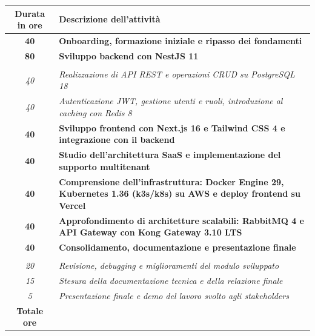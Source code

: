 

\begin{tabularx}{\textwidth}{|c|X|}
	\hline
	\textbf{Durata in ore} & \textbf{Descrizione dell'attività} \\\hline

	\textbf{40} & \textbf{Onboarding, formazione iniziale e ripasso dei fondamenti} \\
	\hline

	\textbf{80} & \textbf{Sviluppo backend con NestJS 11} \\ \hdashline
	\multirow{2}{0cm}\\
	\textit{40} &
	\textit{Realizzazione di API REST e operazioni CRUD su PostgreSQL 18} \\
	\textit{40} &
	\textit{Autenticazione JWT, gestione utenti e ruoli, introduzione al caching con Redis 8} \\
	\hline

	\textbf{40} & \textbf{Sviluppo frontend con Next.js 16 e Tailwind CSS 4 e integrazione con il backend} \\
	\hline

	\textbf{40} & \textbf{Studio dell'architettura SaaS e implementazione del supporto multitenant} \\
	\hline

	\textbf{40} & \textbf{Comprensione dell'infrastruttura: Docker Engine 29, Kubernetes 1.36 (k3s/k8s) su AWS e deploy frontend su Vercel} \\
	\hline

	\textbf{40} & \textbf{Approfondimento di architetture scalabili: RabbitMQ 4 e API Gateway con Kong Gateway 3.10 LTS} \\
	\hline

	\textbf{40} & \textbf{Consolidamento, documentazione e presentazione finale} \\ \hdashline
	\multirow{3}{0cm}\\
	\textit{20} &
	\textit{Revisione, debugging e miglioramenti del modulo sviluppato} \\
	\textit{15} &
	\textit{Stesura della documentazione tecnica e della relazione finale} \\
	\textit{5} &
	\textit{Presentazione finale e demo del lavoro svolto agli stakeholders} \\
	\hline

	\textbf{Totale ore} & \multicolumn{1}{|c|}{\textbf{\totaleOre}} \\\hline


\end{tabularx}